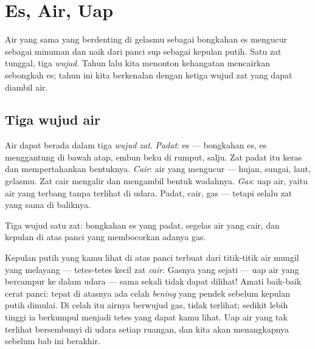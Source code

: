 \chapter{Es, Air, Uap}\label{ch:g2:ice-water-steam}

Air yang sama yang berdenting di gelasmu sebagai bongkahan es
mengucur sebagai minuman dan naik dari panci sup sebagai kepulan
putih. Satu zat tunggal, tiga \emph{wujud}. Tahun lalu kita menonton
kehangatan mencairkan sebongkah es; tahun ini kita berkenalan dengan
ketiga wujud zat yang dapat diambil air.

\section{Tiga wujud air}

\begin{example}\label{ex:g2:ice-water-steam:where}
Air dapat berada dalam tiga \emph{wujud zat}. \emph{Padat}: es ---
bongkahan es, es menggantung di bawah atap, embun beku di rumput,
salju. Zat padat itu keras dan mempertahankan bentuknya. \emph{Cair}:
air yang mengucur --- hujan, sungai, laut, gelasmu. Zat cair mengalir
dan mengambil bentuk wadahnya. \emph{Gas}: uap air, yaitu air yang
terbang tanpa terlihat di udara. Padat, cair, gas --- tetapi selalu
zat yang sama di baliknya.
\end{example}

\begin{omfigure}

{\small Tiga wujud satu zat: bongkahan es yang padat, segelas air yang
cair, dan kepulan di atas panci yang membocorkan adanya gas.}
\end{omfigure}

\begin{remark}\label{rem:g2:ice-water-steam:invisible}
Kepulan putih yang kamu lihat di atas panci terbuat dari titik-titik
air mungil yang melayang --- tetes-tetes kecil zat \emph{cair}.
Gasnya yang sejati --- uap air yang bercampur ke dalam udara --- sama
sekali tidak dapat dilihat! Amati baik-baik cerat panci: tepat di
atasnya ada celah \emph{bening} yang pendek sebelum kepulan putih
dimulai. Di celah itu airnya berwujud gas, tidak terlihat; sedikit
lebih tinggi ia berkumpul menjadi tetes yang dapat kamu lihat. Uap air
yang tak terlihat bersembunyi di udara setiap ruangan, dan kita akan
menangkapnya sebelum bab ini berakhir.
\end{remark}

